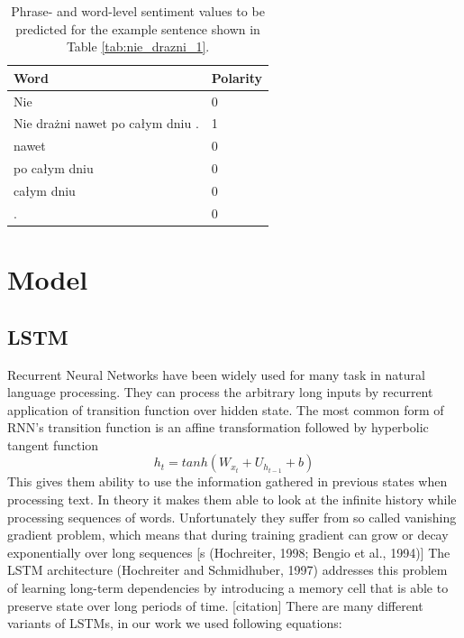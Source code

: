\documentclass[10pt, a4paper]{article}
\begin{document}
\begin{table}[h]
 \begin{center}
\begin{tabular}{|l | l|}

\hline
 Word &	Polarity\\
      \hline
     Nie &	0\\
     \hline
Nie drażni nawet po całym dniu	 . & 1\\
\hline
nawet &	0\\
\hline
po całym dniu &	0\\
\hline
całym dniu &	0\\
\hline
.	& 0\\
      \hline
\end{tabular}
\caption{Phrase- and word-level sentiment values to be predicted for the example sentence shown in Table \ref{tab:nie_drazni_1}.}
\label{tab:nie_drazni_2}
 \end{center}
\end{table}






\section{Model} 


\subsection{LSTM}

Recurrent Neural Networks have been widely used for many task in natural language processing. They can process the arbitrary long inputs by recurrent application of transition function over hidden state. 
	The most common form of RNN's transition function is an affine transformation followed by hyperbolic tangent function
	\begin{equation} h_t = tanh(W_{x_t}+U_{h_{t-1}}+b)
\end{equation}
	  	This gives them ability to use the information gathered in previous states when processing text. In theory it makes them able to look at the infinite history while processing sequences of words. 	Unfortunately they suffer from so called vanishing gradient problem, which means that during training gradient can grow or decay exponentially over long sequences [s (Hochreiter,
1998; Bengio et al., 1994)]
	The LSTM architecture (Hochreiter and Schmidhuber, 1997) addresses this problem of learning long-term dependencies by introducing a memory cell that is able to preserve state over long periods of time. [citation]
		There are many different variants of LSTMs, in our work we used following equations:
		
\end{document}
